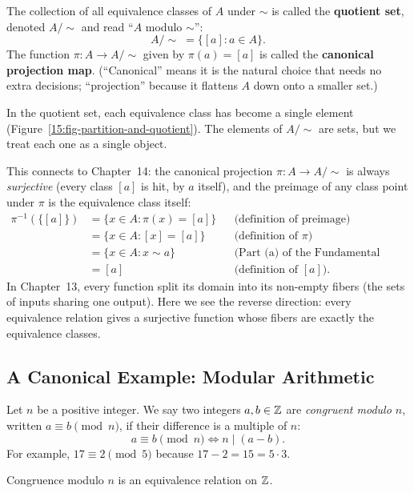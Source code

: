 \begin{definition}
The collection of all equivalence classes of $A$ under $\sim$ is called the \textbf{quotient set}, denoted $A / \!\sim$ and read ``$A$ modulo $\sim$'':
\[
A / \!\sim \; = \{[a] : a \in A\}.
\]
The function $\pi: A \to A / \!\sim$ given by $\pi(a) = [a]$ is called the \textbf{canonical projection map}. (``Canonical'' means it is the natural choice that needs no extra decisions; ``projection'' because it flattens $A$ down onto a smaller set.)
\end{definition}

In the quotient set, each equivalence class has become a single element (Figure~\ref{15:fig-partition-and-quotient}). The elements of $A/\!\sim$ are sets, but we treat each one as a single object.

This connects to Chapter~14: the canonical projection $\pi: A \to A / \!\sim$ is always \emph{surjective} (every class $[a]$ is hit, by $a$ itself), and the preimage of any class point under $\pi$ is the equivalence class itself:
\begin{align*}
\pi^{-1}(\{[a]\}) &= \{x \in A : \pi(x) = [a]\} && \text{(definition of preimage)}\\
&= \{x \in A : [x] = [a]\} && \text{(definition of } \pi\text{)}\\
&= \{x \in A : x \sim a\} && \text{(Part (a) of the Fundamental Theorem)}\\
&= [a] && \text{(definition of } [a]\text{)}.
\end{align*} In Chapter~13, every function split its domain into its non-empty fibers (the sets of inputs sharing one output). Here we see the reverse direction: every equivalence relation gives a surjective function whose fibers are exactly the equivalence classes.

\subsection{A Canonical Example: Modular Arithmetic}

Let $n$ be a positive integer. We say two integers $a, b \in \mathbb{Z}$ are \emph{congruent modulo $n$}, written $a \equiv b \pmod n$, if their difference is a multiple of $n$:
\[
a \equiv b \pmod n \iff n \mid (a - b).
\]
For example, $17 \equiv 2 \pmod 5$ because $17 - 2 = 15 = 5 \cdot 3$.

\begin{theorem}
Congruence modulo $n$ is an equivalence relation on $\mathbb{Z}$.
\end{theorem}

